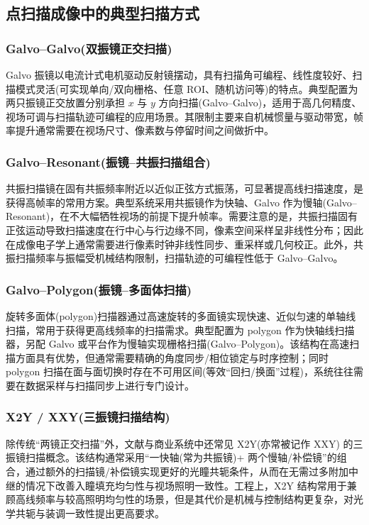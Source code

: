 \subsection{点扫描成像中的典型扫描方式}\label{2.3.2}
\subsubsection{Galvo–Galvo(双振镜正交扫描)}
Galvo 振镜以电流计式电机驱动反射镜摆动，具有扫描角可编程、线性度较好、扫描模式灵活(可实现单向/双向栅格、任意 ROI、随机访问等)的特点。典型配置为两只振镜正交放置分别承担 $x$ 与 $y$ 方向扫描(Galvo–Galvo)，适用于高几何精度、视场可调与扫描轨迹可编程的应用场景。其限制主要来自机械惯量与驱动带宽，帧率提升通常需要在视场尺寸、像素数与停留时间之间做折中。

\subsubsection{Galvo–Resonant(振镜–共振扫描组合)}
共振扫描镜在固有共振频率附近以近似正弦方式振荡，可显著提高线扫描速度，是获得高帧率的常用方案。典型系统采用共振镜作为快轴、Galvo 作为慢轴(Galvo–Resonant)，在不大幅牺牲视场的前提下提升帧率。需要注意的是，共振扫描固有正弦运动导致扫描速度在行中心与行边缘不同，像素空间采样呈非线性分布；因此在成像电子学上通常需要进行像素时钟非线性同步、重采样或几何校正。此外，共振扫描频率与振幅受机械结构限制，扫描轨迹的可编程性低于 Galvo–Galvo。

\subsubsection{Galvo–Polygon(振镜–多面体扫描)}
旋转多面体(polygon)扫描器通过高速旋转的多面镜实现快速、近似匀速的单轴线扫描，常用于获得更高线频率的扫描需求。典型配置为 polygon 作为快轴线扫描器，另配 Galvo 或平台作为慢轴实现栅格扫描(Galvo–Polygon)。该结构在高速扫描方面具有优势，但通常需要精确的角度同步/相位锁定与时序控制；同时 polygon 扫描在面与面切换时存在不可用区间(等效``回扫/换面''过程)，系统往往需要在数据采样与扫描同步上进行专门设计。

\subsubsection{X2Y / XXY(三振镜扫描结构)}
除传统``两镜正交扫描''外，文献与商业系统中还常见 X2Y(亦常被记作 XXY) 的三振镜扫描概念。该结构通常采用``一快轴(常为共振镜)+ 两个慢轴/补偿镜''的组合\cite{RN1325}，通过额外的扫描镜/补偿镜实现更好的光瞳共轭条件，从而在无需过多附加中继的情况下改善入瞳填充均匀性与视场照明一致性。工程上，X2Y 结构常用于兼顾高线频率与较高照明均匀性的场景，但是其代价是机械与控制结构更复杂，对光学共轭与装调一致性提出更高要求。

